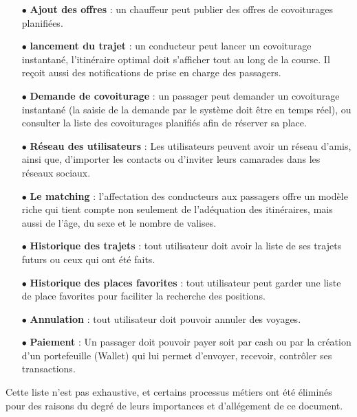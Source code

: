 \begin{itemize}
	\item[$\bullet$] \textbf{Ajout des offres} : un chauffeur peut publier des offres de covoiturages planifiées.
	\item[$\bullet$] \textbf{lancement du trajet} : un conducteur peut lancer un covoiturage instantané, l’itinéraire optimal doit s’afficher tout au long de la course. Il reçoit aussi des notifications de prise en charge des passagers.
	\item[$\bullet$] \textbf{Demande de covoiturage} : un passager peut demander un covoiturage instantané (la saisie de la demande par le système doit être en temps réel), ou consulter la liste des covoiturages planifiés afin de réserver sa place.
	\item[$\bullet$] \textbf{Réseau des utilisateurs} : Les utilisateurs peuvent avoir un réseau d'amis, ainsi que, d'importer les contacts ou d'inviter leurs camarades dans les réseaux sociaux.
	\item[$\bullet$] \textbf{Le matching} : l'affectation des conducteurs aux passagers offre un modèle riche qui tient compte non seulement de l'adéquation des itinéraires, mais aussi de l'âge, du sexe et le nombre de valises.
	\item[$\bullet$] \textbf{Historique des trajets} : tout utilisateur doit avoir la liste de ses trajets futurs ou ceux qui ont été faits.
	\item[$\bullet$] \textbf{Historique des places favorites} : tout utilisateur peut garder une liste de place favorites pour faciliter la recherche des positions.
	\item[$\bullet$] \textbf{Annulation} : tout utilisateur doit pouvoir annuler des voyages.
	\item[$\bullet$] \textbf{Paiement} : Un passager doit pouvoir payer soit par cash ou par la création d'un portefeuille (Wallet) qui lui permet d'envoyer, recevoir, contrôler ses transactions.
\end{itemize}
Cette liste n'est pas exhaustive, et certains processus métiers ont été éliminés pour des raisons du degré de leurs importances et d’allégement de ce document.

